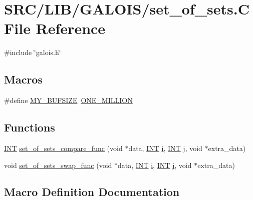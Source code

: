 \hypertarget{set__of__sets_8_c}{}\section{S\+R\+C/\+L\+I\+B/\+G\+A\+L\+O\+I\+S/set\+\_\+of\+\_\+sets.C File Reference}
\label{set__of__sets_8_c}
{\ttfamily \#include \char`\"{}galois.\+h\char`\"{}}\newline
\subsection*{Macros}
\begin{DoxyCompactItemize}
\item 
\#define \mbox{\hyperlink{set__of__sets_8_c_a6079b3b36c54787d2dca2de2fb2c96df}{M\+Y\+\_\+\+B\+U\+F\+S\+I\+ZE}}~\mbox{\hyperlink{galois_8h_a6a146c1b2155b03eb2ffa3f4ba755034}{O\+N\+E\+\_\+\+M\+I\+L\+L\+I\+ON}}
\end{DoxyCompactItemize}
\subsection*{Functions}
\begin{DoxyCompactItemize}
\item 
\mbox{\hyperlink{galois_8h_a09fddde158a3a20bd2dcadb609de11dc}{I\+NT}} \mbox{\hyperlink{set__of__sets_8_c_aaacdae015f9a25f07defff1ee5cee182}{set\+\_\+of\+\_\+sets\+\_\+compare\+\_\+func}} (void $\ast$data, \mbox{\hyperlink{galois_8h_a09fddde158a3a20bd2dcadb609de11dc}{I\+NT}} \mbox{\hyperlink{alphabet2_8_c_acb559820d9ca11295b4500f179ef6392}{i}}, \mbox{\hyperlink{galois_8h_a09fddde158a3a20bd2dcadb609de11dc}{I\+NT}} \mbox{\hyperlink{alphabet2_8_c_a37d972ae0b47b9099e30983131d31916}{j}}, void $\ast$extra\+\_\+data)
\item 
void \mbox{\hyperlink{set__of__sets_8_c_a92d3c967846350d88753d97a0b5f69bc}{set\+\_\+of\+\_\+sets\+\_\+swap\+\_\+func}} (void $\ast$data, \mbox{\hyperlink{galois_8h_a09fddde158a3a20bd2dcadb609de11dc}{I\+NT}} \mbox{\hyperlink{alphabet2_8_c_acb559820d9ca11295b4500f179ef6392}{i}}, \mbox{\hyperlink{galois_8h_a09fddde158a3a20bd2dcadb609de11dc}{I\+NT}} \mbox{\hyperlink{alphabet2_8_c_a37d972ae0b47b9099e30983131d31916}{j}}, void $\ast$extra\+\_\+data)
\end{DoxyCompactItemize}


\subsection{Macro Definition Documentation}
\mbox{\label{set__of__sets_8_c_a6079b3b36c54787d2dca2de2fb2c96df}} 
